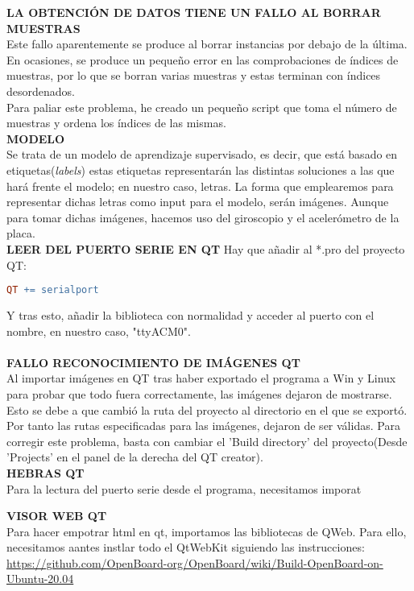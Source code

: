\begin{mimargen}{-1cm}{-1cm}
\textbf{LA OBTENCIÓN DE DATOS TIENE UN FALLO AL BORRAR MUESTRAS} \\
Este fallo aparentemente se produce al borrar instancias por debajo de
la última. En ocasiones, se produce un pequeño error en las comprobaciones
de índices de muestras, por lo que se borran varias muestras y estas terminan
con índices desordenados.\\
Para paliar este problema, he creado un pequeño script que toma el número de
muestras y ordena los índices de las mismas.\\

\textbf{MODELO}\\
Se trata de un modelo de aprendizaje supervisado, es decir, que está basado en
etiquetas(\textit{labels}) estas etiquetas representarán las distintas soluciones
a las que hará frente el modelo; en nuestro caso, letras.
La forma que emplearemos para representar dichas letras como input para el modelo,
serán imágenes. Aunque para tomar dichas imágenes, hacemos uso del giroscopio
y el acelerómetro de la placa.\\


\textbf{LEER DEL PUERTO SERIE EN QT}
Hay que añadir al *.pro del proyecto QT:
\begin{lstlisting}[language=make]
  QT += serialport
\end{lstlisting}
Y tras esto, añadir la biblioteca con normalidad y acceder al puerto
con el nombre, en nuestro caso, "ttyACM0".\\\\

\textbf{FALLO RECONOCIMIENTO DE IMÁGENES QT}\\
Al importar imágenes en QT tras haber exportado el programa a Win y Linux para
probar que todo fuera correctamente, las imágenes dejaron de mostrarse.\\
Esto se debe a que cambió la ruta del proyecto al directorio en el que se
exportó. Por tanto las rutas especificadas para las imágenes, dejaron de ser
válidas. Para corregir este problema, basta con cambiar el 'Build directory' del
proyecto(Desde 'Projects' en el panel de la derecha del QT creator).\\

\textbf{HEBRAS QT}\\
Para la lectura del puerto serie desde el programa, necesitamos imporat

\textbf{VISOR WEB QT}\\
Para hacer empotrar html en qt, importamos las bibliotecas de QWeb. Para ello,
necesitamos aantes instlar todo el QtWebKit siguiendo las instrucciones:
\url{https://github.com/OpenBoard-org/OpenBoard/wiki/Build-OpenBoard-on-Ubuntu-20.04}


\end{mimargen}
